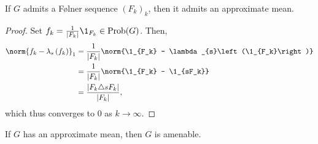 \documentclass[10pt]{mypackage}
\DeclareMathOperator{\Prob}{Prob}
\begin{document}
\begin{proposition}
  If $G$ admits a Følner sequence $\left(F_k\right)_k$, then it admits an approximate mean.
\end{proposition}
\begin{proof}
  Set $f_k = \frac{1}{\left\vert F_k \right\vert}\1_{F_k}\in \Prob(G)$. Then,
  \begin{align*}
    \norm{f_k - \lambda_{s}\left(f_k\right)}_{1} &= \frac{1}{\left\vert F_k \right\vert} \norm{\1_{F_k} - \lambda_{s}\left(\1_{F_k}\right)}\\
                                                 &= \frac{1}{\left\vert F_k \right\vert}\norm{\1_{F_k} - \1_{sF_k}}\\
                                                 &= \frac{\left\vert F_k \triangle sF_k \right\vert}{\left\vert F_k \right\vert},
  \end{align*}
  which thus converges to $0$ as $k\rightarrow \infty$.
\end{proof}
\begin{proposition}
  If $G$ has an approximate mean, then $G$ is amenable.
\end{proposition}
\end{document}
